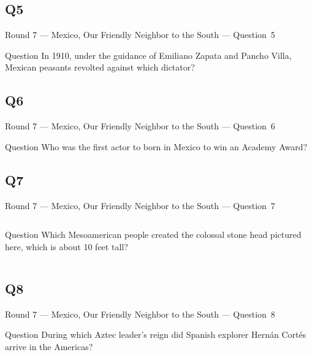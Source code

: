 \documentclass[11pt,draft]{beamer}
\begin{document}
\subsection*{Q5}
\begin{frame}[t]{Round 7 --- Mexico, Our Friendly Neighbor to the South --- \mbox{Question 5}}
    \begin{block}{Question}
        In 1910, under the guidance of Emiliano Zapata and Pancho Villa, Mexican peasants revolted against which dictator?
    \end{block}
\end{frame}
\subsection*{Q6}
\begin{frame}[t]{Round 7 --- Mexico, Our Friendly Neighbor to the South --- \mbox{Question 6}}
    \begin{block}{Question}
        Who was the first actor to born in Mexico to win an Academy Award?
    \end{block}
\end{frame}
\subsection*{Q7}
\begin{frame}[t]{Round 7 --- Mexico, Our Friendly Neighbor to the South --- \mbox{Question 7}}
    \begin{columns}[T,totalwidth=\linewidth]
        \begin{column}{0.32\linewidth}
            \begin{block}{Question}
                Which Mesoamerican people created the colossal stone head pictured here, which is about 10 feet tall?
            \end{block}
        \end{column}
        \begin{column}{0.65\linewidth}
            \begin{center}
                \texttt{[image: \{Images/olmechead]}.jpg}
            \end{center}
        \end{column}
    \end{columns}
\end{frame}
\subsection*{Q8}
\begin{frame}[t]{Round 7 --- Mexico, Our Friendly Neighbor to the South --- \mbox{Question 8}}
    \begin{block}{Question}
        During which Aztec leader's reign did Spanish explorer Hernán Cortés arrive in the Americas?
    \end{block}
\end{frame}
\end{document}
